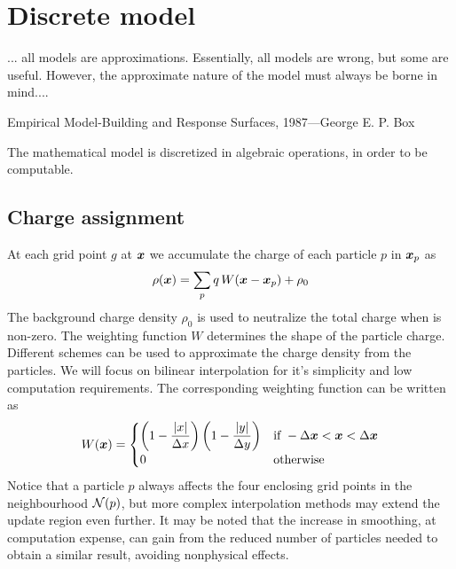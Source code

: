 \chapter{Discrete model}
\label{ch:discrete-model}

\epigraph{... all models are approximations. Essentially, all models are wrong, but some
are useful. However, the approximate nature of the model must always be borne in
mind....}{Empirical Model-Building and Response Surfaces, 1987---George E. P.  
Box}

The mathematical model is discretized in algebraic operations, in order to be 
computable.

\section{Charge assignment}
At each grid point $g$ at $\bm{x}$ we accumulate the charge of each particle $p$ in 
$\bm{x}_p$ as
%
\begin{equation}%
\rho(\x) = \sum_p q\,W(\x - \x_p) + \rho_0
\label{eq:charge-accumulation}
\end{equation}%
%
The background charge density $\rho_0$ is used to neutralize the total charge 
when is non-zero. The weighting function $W$ determines the shape of the 
particle charge. Different schemes can be used to approximate the charge density 
from the particles. We will focus on bilinear interpolation for it's simplicity 
and low computation requirements. The corresponding weighting function can be 
written as
%
\begin{equation}%
W(\x) =
\begin{cases}
			\displaystyle\left(1 - \frac{|x|}{\Delta x}\right)
				\left(1 - \frac{|y|}{\Delta y}\right) & \text{if}\ -\Delta\x < \x < 
				\Delta \x\\
			0 & \text{otherwise}
\end{cases}
\end{equation}%
%
Notice that a particle $p$ always affects the four enclosing grid points in the 
neighbourhood $\mathcal{N}(p)$, but more complex interpolation methods may extend the 
update region even further. It may be noted that the increase in smoothing, at 
computation expense, can gain from the reduced number of particles needed to 
obtain a similar result, avoiding nonphysical effects.
%
